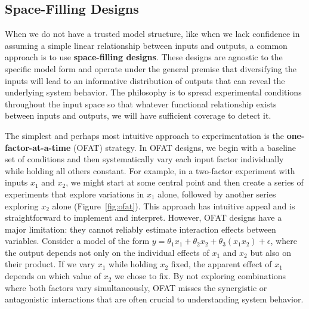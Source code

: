 \subsection{Space-Filling Designs}
When we do not have a trusted model structure, like when we lack confidence in assuming a simple linear relationship between inputs and outputs, a common approach is to use \textbf{space-filling designs}. These designs are agnostic to the specific model form and operate under the general premise that diversifying the inputs will lead to an informative distribution of outputs that can reveal the underlying system behavior. The philosophy is to spread experimental conditions throughout the input space so that whatever functional relationship exists between inputs and outputs, we will have sufficient coverage to detect it.

The simplest and perhaps most intuitive approach to experimentation is the \textbf{one-factor-at-a-time} (OFAT) strategy. In OFAT designs, we begin with a baseline set of conditions and then systematically vary each input factor individually while holding all others constant. For example, in a two-factor experiment with inputs $x_1$ and $x_2$, we might start at some central point and then create a series of experiments that explore variations in $x_1$ alone, followed by another series exploring $x_2$ alone (Figure~\ref{fig:ofat}). This approach has intuitive appeal and is straightforward to implement and interpret. However, OFAT designs have a major limitation: they cannot reliably estimate interaction effects between variables. Consider a model of the form $y = \theta_1 x_1 + \theta_2 x_2 + \theta_3 (x_1 x_2) + \epsilon$, where the output depends not only on the individual effects of $x_1$ and $x_2$ but also on their product. If we vary $x_1$ while holding $x_2$ fixed, the apparent effect of $x_1$ depends on which value of $x_2$ we chose to fix. By not exploring combinations where both factors vary simultaneously, OFAT misses the synergistic or antagonistic interactions that are often crucial to understanding system behavior.

